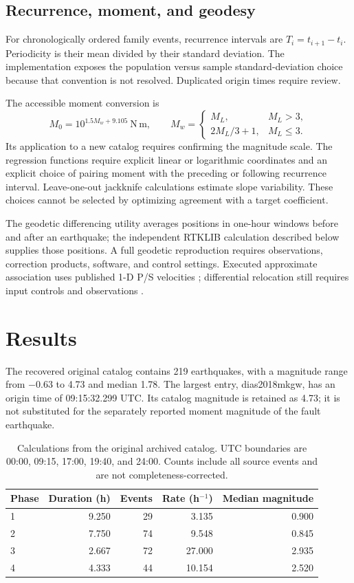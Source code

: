 \documentclass[11pt]{article}
\begin{document}
\subsection{Recurrence, moment, and geodesy}
For chronologically ordered family events, recurrence intervals are $T_i=t_{i+1}-t_i$. Periodicity is their mean divided by their standard deviation. The implementation exposes the population versus sample standard-deviation choice because that convention is not resolved. Duplicated origin times require review.

The accessible moment conversion is
\begin{equation}
 M_0=10^{1.5 M_w+9.105}\ \mathrm{N\,m},\qquad
 M_w=\begin{cases}M_L,&M_L>3,\\2M_L/3+1,&M_L\leq3.\end{cases}
\end{equation}
Its application to a new catalog requires confirming the magnitude scale. The regression functions require explicit linear or logarithmic coordinates and an explicit choice of pairing moment with the preceding or following recurrence interval. Leave-one-out jackknife calculations estimate slope variability. These choices cannot be selected by optimizing agreement with a target coefficient.

The geodetic differencing utility averages positions in one-hour windows before and after an earthquake; the independent RTKLIB calculation described below supplies those positions. A full geodetic reproduction requires observations, correction products, software, and control settings. Executed approximate association uses published 1-D P/S velocities \citep{tepp2014,pyocto}; differential relocation still requires input controls and observations \citep{waldhauser2001}.

\section{Results}
The recovered original catalog contains 219 earthquakes, with a magnitude range from $-0.63$ to 4.73 and median 1.78. The largest entry, dias2018mkgw, has an origin time of 09:15:32.299 UTC. Its catalog magnitude is retained as 4.73; it is not substituted for the separately reported moment magnitude of the fault earthquake.

\begin{table}[ht]
\centering
\begin{tabular}{lrrrr}\toprule
Phase & Duration (h) & Events & Rate (h$^{-1}$) & Median magnitude\\\midrule
1 & 9.250 & 29 & 3.135 & 0.900\\
2 & 7.750 & 74 & 9.548 & 0.845\\
3 & 2.667 & 72 & 27.000 & 2.935\\
4 & 4.333 & 44 & 10.154 & 2.520\\\bottomrule
\end{tabular}
\caption{Calculations from the original archived catalog. UTC boundaries are 00:00, 09:15, 17:00, 19:40, and 24:00. Counts include all source events and are not completeness-corrected.}
\label{tab:phases}
\end{table}
\end{document}
